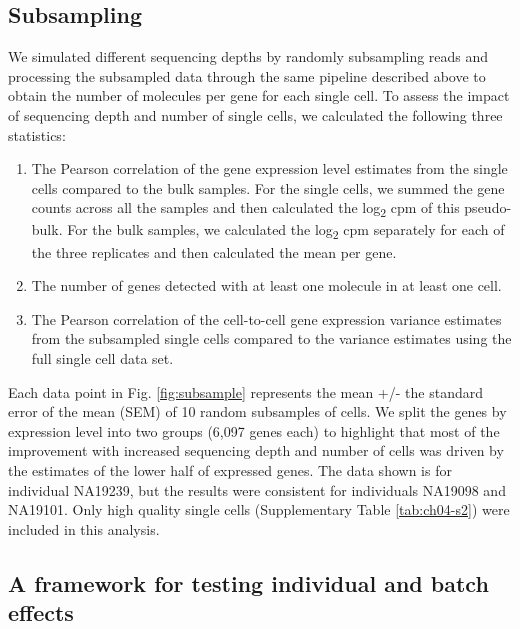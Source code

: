 \subsection{Subsampling}\label{subsampling}

We simulated different sequencing depths by randomly subsampling reads
and processing the subsampled data through the same pipeline described
above to obtain the number of molecules per gene for each single cell.
To assess the impact of sequencing depth and number of single cells, we
calculated the following three statistics:

\begin{enumerate}
\def\labelenumi{\arabic{enumi}.}
\itemsep1pt\parskip0pt
\item
  The Pearson correlation of the gene expression level estimates from
  the single cells compared to the bulk samples. For the single cells,
  we summed the gene counts across all the samples and then calculated
  the log\textsubscript{2} cpm of this pseudo-bulk. For the bulk
  samples, we calculated the log\textsubscript{2} cpm separately for
  each of the three replicates and then calculated the mean per gene.
\item
  The number of genes detected with at least one molecule in at least
  one cell.
\item
  The Pearson correlation of the cell-to-cell gene expression variance
  estimates from the subsampled single cells compared to the variance
  estimates using the full single cell data set.
\end{enumerate}

Each data point in Fig. \ref{fig:subsample} represents the mean +/- the standard error of
the mean (SEM) of 10 random subsamples of cells. We split the genes by
expression level into two groups (6,097 genes each) to highlight that
most of the improvement with increased sequencing depth and number of
cells was driven by the estimates of the lower half of expressed genes.
The data shown is for individual NA19239, but the results were
consistent for individuals NA19098 and NA19101. Only high quality single
cells (Supplementary Table \ref{tab:ch04-s2}) were included in this analysis.

\subsection{A framework for testing individual and batch
effects}\label{a-framework-for-testing-individual-and-batch-effects}

